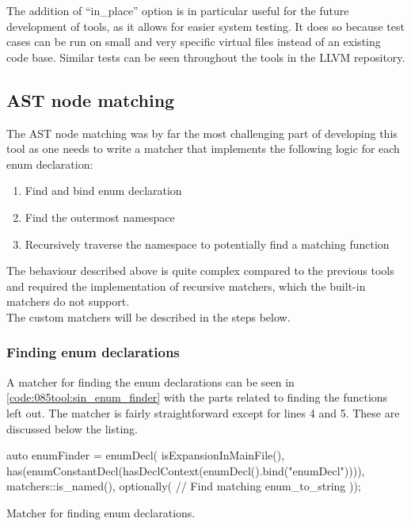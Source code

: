 The addition of ``in\_place'' option is in particular useful for the future development of tools, as it allows for easier system testing. It does so because test cases can be run on small and very specific virtual files instead of an existing code base.
Similar tests can be seen throughout the tools in the LLVM repository.

\subsection{AST node matching}\label{subsec:085tool:enum_node_matching_sin}

The AST node matching was by far the most challenging part of developing this tool as one needs to write a matcher that implements the following logic for each enum declaration:

\vspace*{-0.75em}
\begin{enumerate}
    \item Find and bind enum declaration
    \item Find the outermost namespace
    \item Recursively traverse the namespace to potentially find a matching  function
\end{enumerate}

The behaviour described above is quite complex compared to the previous tools and required the implementation of recursive matchers, which the built-in matchers do not support. \\
The custom matchers will be described in the steps below.

\subsubsection*{Finding enum declarations}
A matcher for finding the enum declarations can be seen in \cref{code:085tool:sin_enum_finder} with the parts related to finding the  functions left out.
The matcher is fairly straightforward except for lines 4 and 5. These are discussed below the listing.

\begin{listing}[H]
    \begin{cppcode}
auto enumFinder = enumDecl(
        isExpansionInMainFile(),
        has(enumConstantDecl(hasDeclContext(enumDecl().bind("enumDecl")))),
        matchers::is_named(),
        optionally(
            // Find matching enum_to_string
        ));
    \end{cppcode}
    \caption{Matcher for finding enum declarations.}
    \label{code:085tool:sin_enum_finder}
\end{listing}


